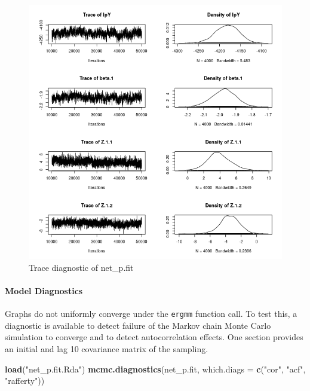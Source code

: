 \documentclass[]{article}
\newenvironment{Shaded}{\begin{snugshade}}{\end{snugshade}}
\newcommand{\DataTypeTok}[1]{\textcolor[rgb]{0.13,0.29,0.53}{#1}}
\newcommand{\KeywordTok}[1]{\textcolor[rgb]{0.13,0.29,0.53}{\textbf{#1}}}
\newcommand{\NormalTok}[1]{#1}
\newcommand{\StringTok}[1]{\textcolor[rgb]{0.31,0.60,0.02}{#1}}
\let\oldparagraph\paragraph
\renewcommand{\paragraph}[1]{\oldparagraph{#1}\mbox{}}
\begin{document}
\begin{figure}
\centering
\includegraphics{net_p.fit_trace.png}
\caption{Trace diagnostic of net\_p.fit}
\end{figure}

\hypertarget{model-diagnostics}{%
\paragraph{Model Diagnostics}\label{model-diagnostics}}

Graphs do not uniformly converge under the \texttt{ergmm} function call.
To test this, a diagnostic is available to detect failure of the Markov
chain Monte Carlo simulation to converge and to detect autocorrelation
effects. One section provides an initial and lag 10 covariance matrix of
the sampling.

\begin{Shaded}
\begin{Highlighting}[]
\KeywordTok{load}\NormalTok{(}\StringTok{"net_p.fit.Rda"}\NormalTok{)}
\KeywordTok{mcmc.diagnostics}\NormalTok{(net_p.fit, }\DataTypeTok{which.diags =} \KeywordTok{c}\NormalTok{(}\StringTok{"cor"}\NormalTok{, }\StringTok{"acf"}\NormalTok{, }\StringTok{"rafferty"}\NormalTok{))}
\end{Highlighting}
\end{Shaded}
\end{document}
